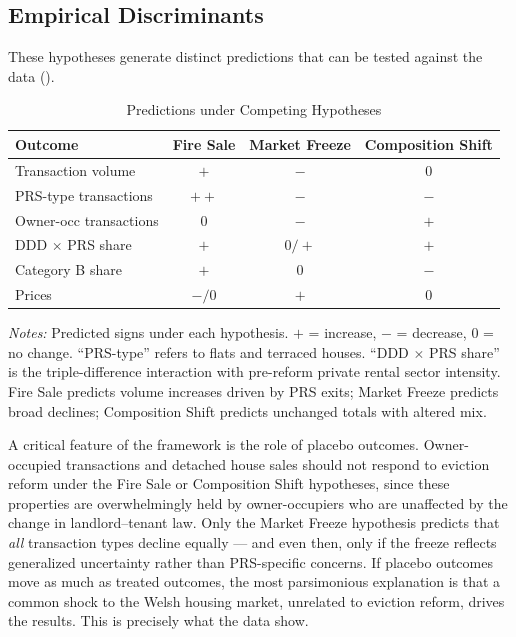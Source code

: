 \documentclass[12pt]{article}
\begin{document}
\subsection{Empirical Discriminants}

These hypotheses generate distinct predictions that can be tested against the data ().

\begin{table}[H]
\centering
\caption{Predictions under Competing Hypotheses}
\label{tab:predictions}
\begin{threeparttable}
\begin{tabular}{lccc}
\toprule
Outcome & \textbf{Fire Sale} & \textbf{Market Freeze} & \textbf{Composition Shift} \\
\midrule
Transaction volume      & $+$    & $-$    & $0$    \\
PRS-type transactions   & $++$   & $-$    & $-$    \\
Owner-occ transactions  & $0$    & $-$    & $+$    \\
DDD $\times$ PRS share  & $+$    & $0/+$  & $+$    \\
Category B share        & $+$    & $0$    & $-$    \\
Prices                  & $-/0$  & $+$    & $0$    \\
\bottomrule
\end{tabular}
\begin{tablenotes}[flushleft]
\small
\item \textit{Notes:} Predicted signs under each hypothesis. $+$ = increase, $-$ = decrease, $0$ = no change. ``PRS-type'' refers to flats and terraced houses. ``DDD $\times$ PRS share'' is the triple-difference interaction with pre-reform private rental sector intensity. Fire Sale predicts volume increases driven by PRS exits; Market Freeze predicts broad declines; Composition Shift predicts unchanged totals with altered mix.
\end{tablenotes}
\end{threeparttable}
\end{table}

A critical feature of the framework is the role of placebo outcomes. Owner-occupied transactions and detached house sales should not respond to eviction reform under the Fire Sale or Composition Shift hypotheses, since these properties are overwhelmingly held by owner-occupiers who are unaffected by the change in landlord--tenant law. Only the Market Freeze hypothesis predicts that \textit{all} transaction types decline equally --- and even then, only if the freeze reflects generalized uncertainty rather than PRS-specific concerns. If placebo outcomes move as much as treated outcomes, the most parsimonious explanation is that a common shock to the Welsh housing market, unrelated to eviction reform, drives the results. This is precisely what the data show.
\end{document}
